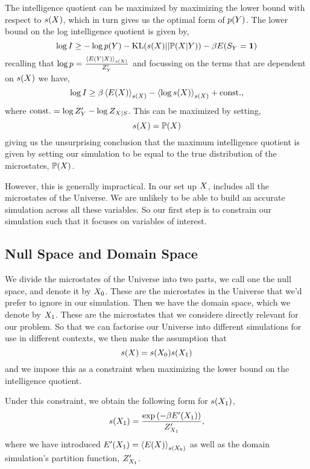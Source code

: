 \documentclass[]{article}
\begin{document}
The intelligence quotient can be maximized by maximizing the lower bound with respect to $s(X)$, which in turn gives us the optimal form of $p(Y)$. The lower bound on the log intelligence quotient is given by,
\[
\log I \geq - \log p(Y) -\text{KL}(s(X)||\mathbb{P}(X|Y)) - \beta E(S_Y = \textbf{1})
\]
recalling that $\log p = \frac{\left\langle E(Y|X) \right\rangle_{s(X)}}{Z^\prime_Y}$ and focussing on the terms that are dependent on $s(X)$ we have,
\[
\log I \geq \beta \left\langle E(X) \right\rangle_{s(X)} - \left\langle \log s(X) \right\rangle_{s(X)} + \text{const.},
\]
where $\text{const.} = \log Z^\prime_Y - \log Z_{X|S}$. This can be maximized by setting,
\[
s(X) = \mathbb{P}(X)
\]
giving us the unsurprising conclusion that the maximum intelligence quotient is given by setting our simulation to be equal to the true distribution of the microstates, $\mathbb{P}(X)$. 

However, this is generally impractical. In our set up $X$, includes all the microstates of the Universe. We are unlikely to be able to build an accurate simulation across all these variables. So our first step is to constrain our simulation such that it focuses on variables of interest.

\subsection{Null Space and Domain Space}

We divide the microstates of the Universe into two parts, we call one the null space, and denote it by ${X_0}$. These are the microstates in the Universe that we'd prefer to ignore in our simulation. Then we have the domain space, which we denote by ${X_1}$. These are the microstates that we considere directly relevant for our problem. So that we can factorise our Universe into different simulations for use in different contexts, we then make the assumption that
\[
s(X) = s({X_0}) s({X_1})
\]
and we impose this as a constraint when maximizing the lower bound on the intelligence quotient.

Under this constraint, we obtain the following form for $s({X_1})$,
\[
s({X_1}) = \frac{\exp \left(-\beta E^\prime({X_1})\right)}{Z^\prime_{X_1}},
\]
where we have introduced $E^\prime({X_1}) = \left\langle E(X) \right\rangle_{s({X_0})}$ as well as the domain simulation's partition function, $Z^\prime_{X_1}$.
\end{document}
